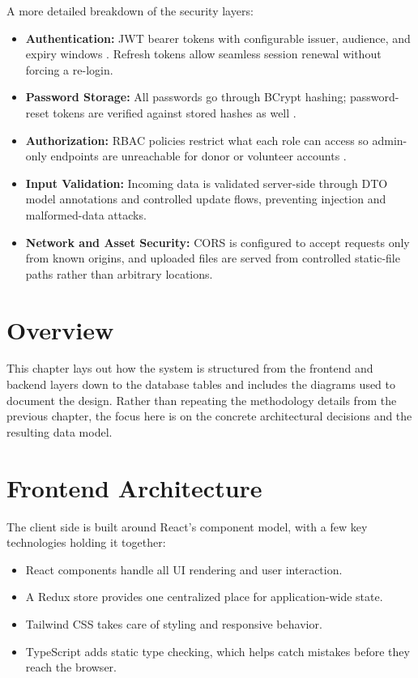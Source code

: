\documentclass{thesis-library}
\begin{document}
A more detailed breakdown of the security layers:
\begin{itemize}
    \item \textbf{Authentication:} JWT bearer tokens with configurable issuer, audience, and expiry windows \cite{jones2015jwt}. Refresh tokens allow seamless session renewal without forcing a re-login.
    \item \textbf{Password Storage:} All passwords go through BCrypt hashing; password-reset tokens are verified against stored hashes as well \cite{provos1999bcrypt}.
    \item \textbf{Authorization:} RBAC policies restrict what each role can access so admin-only endpoints are unreachable for donor or volunteer accounts \cite{sandhu1996rbac}.
    \item \textbf{Input Validation:} Incoming data is validated server-side through DTO model annotations and controlled update flows, preventing injection and malformed-data attacks.
    \item \textbf{Network and Asset Security:} CORS is configured to accept requests only from known origins, and uploaded files are served from controlled static-file paths rather than arbitrary locations.
\end{itemize}

\section{Overview}
This chapter lays out how the system is structured from the frontend and backend layers down to the database tables and includes the diagrams used to document the design. Rather than repeating the methodology details from the previous chapter, the focus here is on the concrete architectural decisions and the resulting data model.

\section{Frontend Architecture}
The client side is built around React's component model, with a few key technologies holding it together:
\begin{itemize}
    \item React components handle all UI rendering and user interaction.
    \item A Redux store provides one centralized place for application-wide state.
    \item Tailwind CSS takes care of styling and responsive behavior.
    \item TypeScript adds static type checking, which helps catch mistakes before they reach the browser.
\end{itemize}
\end{document}
